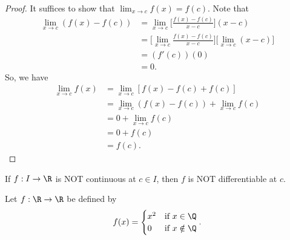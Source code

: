 \begin{proof}
It suffices to show that \( \lim_{ x \to c } f(x) = f(c) \). Note that 
\begin{align*}
    \lim_{ x \to c } (f(x) - f(c)) &= \lim_{ x \to c }  \Big[ \frac{ f(x) - f(c) }{  x - c  }  \Big] (x - c) \\
                                   &= \Big[ \lim_{ x \to c }  \frac{ f(x) - f(c) }{  x - c  }  \Big] \Big[ \lim_{ x \to c }  (x - c) \Big] \\
                                   &= (f'(c)) (0) \\
                                   &= 0.
\end{align*}
So, we have 
\begin{align*}
    \lim_{ x \to c } f(x) &= \lim_{ x \to c }  [f(x)  - f(c) + f(c)] \\ 
                          &= \lim_{ x \to c } (f(x) - f(c)) + \lim_{ x \to c } f(c) \\   
                          &= 0 + \lim_{ x \to c } f(c) \\
                          &= 0 + f(c) \\
                          &= f(c).
\end{align*}
\end{proof}

\begin{corollary}
    If \( f: I \to \R  \) is NOT continuous at \( c \in I  \), then \( f \) is NOT differentiable at \( c  \).
\end{corollary}

\begin{eg}
    Let \( f: \R \to \R  \) be defined by 
    \[  f(x) = 
    \begin{cases}
        x^{2} &\text{if} \  x \in \Q \\
        0 &\text{if} \ x \notin \Q 
    \end{cases}. \]
\end{eg}

